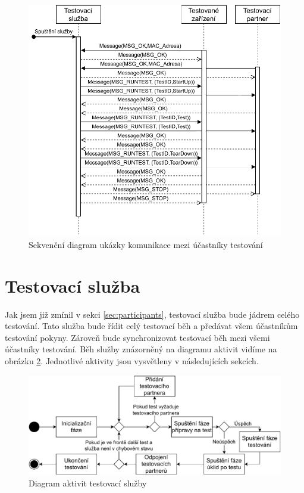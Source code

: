 \begin{figure}[htbp]
    \centering 
    \includegraphics[width=\textwidth]{assets/img/sequencediagram.pdf}
    \caption{Sekvenční diagram ukázky komunikace mezi účastníky testování}
    \label{fig:seqdiag}
\end{figure}

\section{Testovací služba}
Jak jsem již zmínil v sekci \ref{sec:participants}, testovací služba bude jádrem celého testování. Tato služba bude řídit celý testovací běh a předávat všem účastníkům testování pokyny. Zároveň bude synchronizovat testovací běh mezi všemi účastníky testování. Běh služby znázorněný na diagramu aktivit vidíme na obrázku \ref{fig:activitydiagramservice}. Jednotlivé aktivity jsou vysvětleny v následujících sekcích. 

\begin{figure}[htbp]
    \centering 
    \includegraphics[width=\textwidth]{assets/img/activitydiagramservice.pdf}
    \caption{Diagram aktivit testovací služby}
    \label{fig:activitydiagramservice}
\end{figure}

